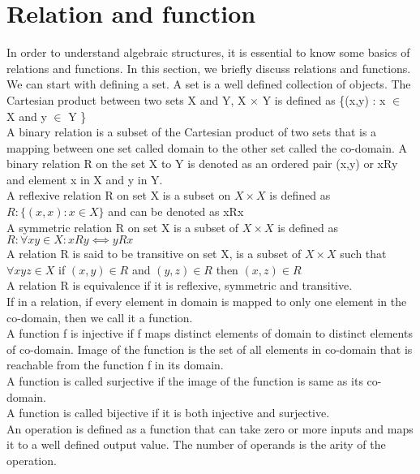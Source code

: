 \section{Relation and function}
In order to understand algebraic structures, it is essential to know some basics of relations and functions. In this section, we briefly discuss relations and functions. We can start with defining a set. A set is a well defined collection of objects. The Cartesian product between two sets X and Y,  X \(\times\) Y is defined as \{(x,y) : x \(\in\) X and y \(\in\) Y \} \\
A binary relation is a subset of the Cartesian product of two sets that is a mapping between one set called domain to the other set called the co-domain. A binary relation R on the set X to Y is denoted as an ordered pair (x,y) or xRy and element x in X and y in Y. \\
A reflexive relation R on set X is a subset on \(X \times X\)  is defined as \( R : \{(x,x) : x \in X\}\) and can be denoted as xRx \\
A symmetric relation R on set X is a subset of \(X \times X\) is defined as \(R: \forall x y \in X: xRy ⟺ yRx\)  \\
A relation R is said to be transitive on set X, is a subset of \(X \times X\) such that \(∀ x y z \in X \) if \((x,y) \in R\) and \((y,z) \in R \) then \((x,z) \in R\)\\
A relation R is equivalence if it is reflexive, symmetric and transitive. \\
If in a relation, if every element in domain is mapped to only one element in the co-domain, then we call it a function.\\
A function f is injective if f maps distinct elements of domain to distinct elements of co-domain.
Image of the function is the set of all elements in co-domain that is reachable from the function f in its domain.\\
A function is called surjective if the image of the function is same as its co-domain.\\
A function is called bijective if it is both injective and surjective.\\
An operation is defined as a function that can take zero or more inputs and maps it to a well defined output value. The number of operands is the arity of the operation.

